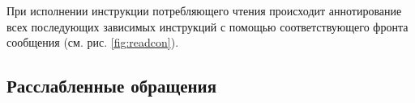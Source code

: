 %
При исполнении инструкции потребляющего чтения происходит аннотирование
всех последующих зависимых инструкций с помощью соответствующего фронта сообщения
(см. рис. \ref{fig:readcon}).


\subsection{Расслабленные обращения}
\label{sec:opc11:formal:rlx}

